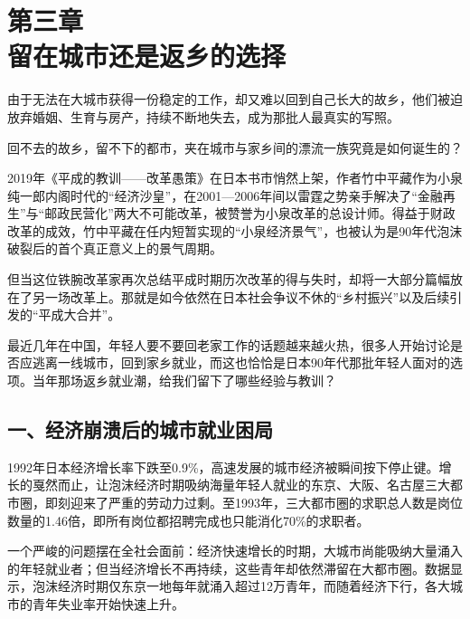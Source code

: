 

\section[第三章\q 留在城市还是返乡的选择]{第三章\\ 留在城市还是返乡的选择}


{\fangsong 由于无法在大城市获得一份稳定的工作，却又难以回到自己长大的故乡，他们被迫放弃婚姻、生育与房产，持续不断地失去，成为那批人最真实的写照。\par}

{\fangsong 回不去的故乡，留不下的都市，夹在城市与家乡间的漂流一族究竟是如何诞生的？\par}

2019年《平成的教训——改革愚策》在日本书市悄然上架，作者竹中平藏作为小泉纯一郎内阁时代的“经济沙皇”，在2001—2006年间以雷霆之势亲手解决了“金融再生”与“邮政民营化”两大不可能改革，被赞誉为小泉改革的总设计师。得益于财政改革的成效，竹中平藏在任内短暂实现的“小泉经济景气”，也被认为是90年代泡沫破裂后的首个真正意义上的景气周期。

但当这位铁腕改革家再次总结平成时期历次改革的得与失时，却将一大部分篇幅放在了另一场改革上。那就是如今依然在日本社会争议不休的“乡村振兴”以及后续引发的“平成大合并”。

最近几年在中国，年轻人要不要回老家工作的话题越来越火热，很多人开始讨论是否应逃离一线城市，回到家乡就业，而这也恰恰是日本90年代那批年轻人面对的选项。当年那场返乡就业潮，给我们留下了哪些经验与教训？

\subsection{一、经济崩溃后的城市就业困局}

1992年日本经济增长率下跌至0.9\%，高速发展的城市经济被瞬间按下停止键。增长的戛然而止，让泡沫经济时期吸纳海量年轻人就业的东京、大阪、名古屋三大都市圈，即刻迎来了严重的劳动力过剩。至1993年，三大都市圈的求职总人数是岗位数量的1.46倍，即所有岗位都招聘完成也只能消化70\%的求职者。

一个严峻的问题摆在全社会面前：经济快速增长的时期，大城市尚能吸纳大量涌入的年轻就业者；但当经济增长不再持续，这些青年却依然滞留在大都市圈。数据显示，泡沫经济时期仅东京一地每年就涌入超过12万青年，而随着经济下行，各大城市的青年失业率开始快速上升。


